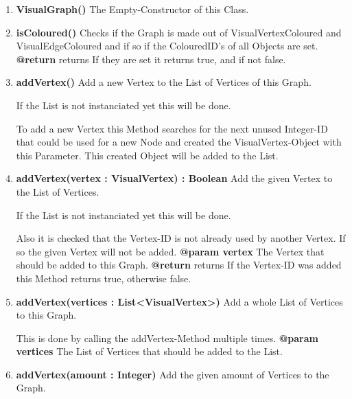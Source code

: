 				\begin{enumerate}[+]
					\item{
						\textbf{VisualGraph()} \newline
						The Empty-Constructor of this Class.
						\newline
					}
					\item{
						\textbf{isColoured()} \newline
						Checks if the Graph is made out of VisualVertexColoured and VisualEdgeColoured and if so if the ColouredID's of all Objects are set.
						\newline
						\textbf{@return} returns
							If they are set it returns true, and if not false.
							\newline
					}
					\item{
						\textbf{addVertex()} \newline
						Add a new Vertex to the List of Vertices of this Graph.
						
						If the List is not instanciated yet this will be done.
						
						To add a new Vertex this Method searches for the next unused Integer-ID that could be used for a new Node and created the VisualVertex-Object with this Parameter.
						This created Object will be added to the List.
						\newline
					}
					\item{
						\textbf{addVertex(vertex : VisualVertex) : Boolean} \newline
						Add the given Vertex to the List of Vertices.
						
						If the List is not instanciated yet this will be done.
						
						Also it is checked that the Vertex-ID is not already used by another Vertex.
						If so the given Vertex will not be added.
						\newline
						\textbf{@param vertex}
							The Vertex that should be added to this Graph.
							\newline
						\textbf{@return} returns
							If the Vertex-ID was added this Method returns true, otherwise false.
							\newline
					}
					\item{
						\textbf{addVertex(vertices : List<VisualVertex>)} \newline
						Add a whole List of Vertices to this Graph.
						
						This is done by calling the addVertex-Method multiple times.
						\newline
						\textbf{@param vertices}
							The List of Vertices that should be added to the List.
							\newline
					}
					\item{
						\textbf{addVertex(amount : Integer)} \newline
						Add the given amount of Vertices to the Graph.
						
}
\end{enumerate}
